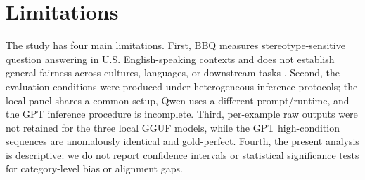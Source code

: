 \section{Limitations}
The study has four main limitations. First, BBQ measures stereotype-sensitive question answering in U.S. English-speaking contexts and does not establish general fairness across cultures, languages, or downstream tasks \citep{parrish2022bbq}. Second, the evaluation conditions were produced under heterogeneous inference protocols; the local panel shares a common setup, Qwen uses a different prompt/runtime, and the GPT inference procedure is incomplete. Third, per-example raw outputs were not retained for the three local GGUF models, while the GPT high-condition sequences are anomalously identical and gold-perfect. Fourth, the present analysis is descriptive: we do not report confidence intervals or statistical significance tests for category-level bias or alignment gaps.

